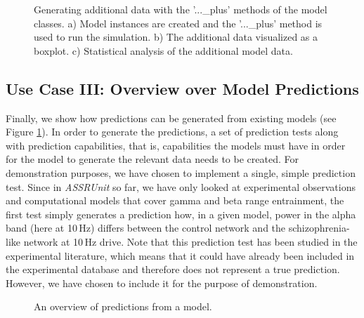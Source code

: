 \documentclass[a4paper,10pt]{article}
\begin{document}
\begin{figure}
\caption{Generating additional data with the '...\_plus' methods of the model classes. a) Model instances are created and the '...\_plus' method is used to run the simulation. b) The additional data visualized
as a boxplot. c) Statistical analysis of the additional model data.}
\label{Fig:ModelPlusMethods}
\end{figure}

\subsection{Use Case III: Overview over Model Predictions}
Finally, we show how predictions can be generated from existing models (see Figure \ref{Fig:ModelPlusMethods}). In order to generate the predictions, a set of prediction tests along with prediction capabilities, that is, 
capabilities the models must have 
in order for the model to generate the relevant data needs to be created. For demonstration purposes, we have chosen to implement a single, simple prediction test. Since in \textit{ASSRUnit} so far, we have only looked 
at experimental observations and computational models that cover gamma and beta range entrainment, the first test simply generates a prediction how, in a given model, power in the alpha band (here at 10\,Hz)
differs between the control network and the schizophrenia-like network at 10\,Hz drive.
Note that this prediction 
test has been studied in the experimental literature, which means that it could have already been included in the experimental database and therefore does not represent a true prediction.
However, we have chosen to include it for the purpose of demonstration. 
\begin{figure}
\label{Fig:Tests4040}
\caption{An overview of predictions from a model.}
\end{figure}
\end{document}
